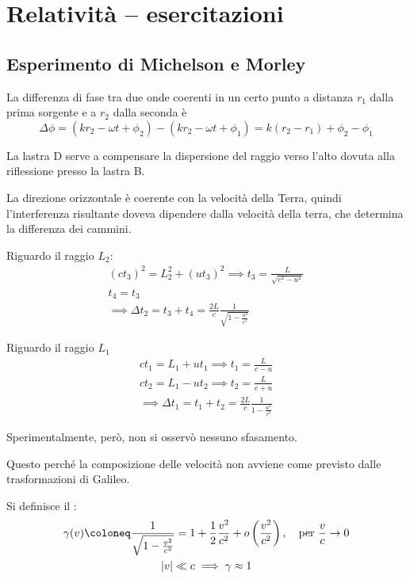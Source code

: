 \chapter{Relatività -- esercitazioni}
\label{sec:relativita}

\section{Esperimento di Michelson e Morley}

La differenza di fase tra due onde coerenti in un certo punto a distanza $r_1$ dalla prima sorgente e a $r_2$ dalla seconda è
\begin{equation}
    \Delta \phi = (k r_2 - \omega t + \phi_2) - (k r_2 - \omega t + \phi_1) = k (r_2 - r_1) + \phi_2 - \phi_1
\end{equation}


La lastra D serve a compensare la dispersione del raggio verso l'alto dovuta alla riflessione presso la lastra B.

La direzione orizzontale è coerente con la velocità della Terra, quindi l'interferenza risultante doveva dipendere dalla velocità della terra, che determina la differenza dei cammini.

Riguardo il raggio $L_2$:
\begin{gather}
    (c t_3)^2 = L_2^2 + (u t_3)^2 \implies t_3 = \frac{L}{\sqrt{c^2 - u^2}} \\
    t_4 = t_3 \\
    \implies \Delta t_2 = t_3 + t_4  = \frac{2 L}{c} \frac{1}{\sqrt{1 - \frac{u^2}{c^2}}}
\end{gather}

Riguardo il raggio $L_1$
\begin{gather}
    c t_1 = L_1 + u t_1 \implies t_1 = \frac{L}{c - u} \\
    c t_2 = L_1 - u t_2 \implies t_2 = \frac{L}{c + u} \\
    \implies \Delta t_1 = t_1 + t_2 = \frac{2 L}{c} \frac{1}{1 - \frac{u^2}{c^2}}
\end{gather}

Sperimentalmente, però, non si osservò nessuno sfasamento.

Questo perché la composizione delle velocità non avviene come previsto dalle trasformazioni di Galileo.

Si definisce il :
\begin{gather}
    \gamma(v) \coloneq \frac{1}{\sqrt{1 - \frac{v^2}{c^2}}}
    = 1 + \frac{1}{2} \frac{v^2}{c^2} + o\pts{\frac{v^2}{c^2}}, \quad \text{per } \frac{v}{c} \to 0 \\
    \abs{v} \ll c \implies \gamma \approx 1
\end{gather}


